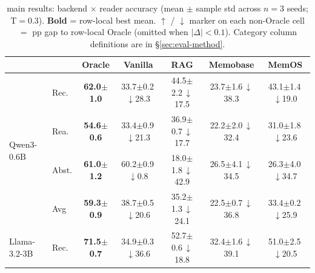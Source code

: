 \begin{table}[t]
\centering
\caption{\benchL{} main results: backend $\times$ reader accuracy (mean $\pm$ sample std across $n=3$ seeds; T$=$0.3). \textbf{Bold} = row-local best mean. {\tiny\textcolor{green!55!black}{$\uparrow$}} / {\tiny\textcolor{red!70!black}{$\downarrow$}} marker on each non-Oracle cell $=$ pp gap to row-local Oracle (omitted when $|\Delta| < 0.1$). Category column definitions are in \S\ref{sec:eval-method}.}
\label{tab:results-L}
\footnotesize
\setlength{\tabcolsep}{4pt}
\renewcommand{\arraystretch}{1.15}
\begin{tabular}{@{}ll c c c c c @{}}
\toprule
 & & \textbf{Oracle} & \textbf{Vanilla} & \textbf{RAG} & \textbf{Memobase} & \textbf{MemOS} \\
\midrule
\multirow{4}{*}{Qwen3-0.6B} & Rec. & \textbf{62.0{\scriptsize$\pm$1.0}} & 33.7{\scriptsize$\pm$0.2}\,{\tiny\textcolor{red!70!black}{$\downarrow$28.3}} & 44.5{\scriptsize$\pm$2.2}\,{\tiny\textcolor{red!70!black}{$\downarrow$17.5}} & 23.7{\scriptsize$\pm$1.6}\,{\tiny\textcolor{red!70!black}{$\downarrow$38.3}} & 43.1{\scriptsize$\pm$1.4}\,{\tiny\textcolor{red!70!black}{$\downarrow$19.0}} \\
 & Rea. & \textbf{54.6{\scriptsize$\pm$0.6}} & 33.4{\scriptsize$\pm$0.9}\,{\tiny\textcolor{red!70!black}{$\downarrow$21.3}} & 36.9{\scriptsize$\pm$0.7}\,{\tiny\textcolor{red!70!black}{$\downarrow$17.7}} & 22.2{\scriptsize$\pm$2.0}\,{\tiny\textcolor{red!70!black}{$\downarrow$32.4}} & 31.0{\scriptsize$\pm$1.8}\,{\tiny\textcolor{red!70!black}{$\downarrow$23.6}} \\
 & Abst. & \textbf{61.0{\scriptsize$\pm$1.2}} & 60.2{\scriptsize$\pm$0.9}\,{\tiny\textcolor{red!70!black}{$\downarrow$0.8}} & 18.0{\scriptsize$\pm$1.8}\,{\tiny\textcolor{red!70!black}{$\downarrow$42.9}} & 26.5{\scriptsize$\pm$4.1}\,{\tiny\textcolor{red!70!black}{$\downarrow$34.5}} & 26.3{\scriptsize$\pm$4.0}\,{\tiny\textcolor{red!70!black}{$\downarrow$34.7}} \\
 & Avg & \textbf{59.3{\scriptsize$\pm$0.9}} & 38.7{\scriptsize$\pm$0.5}\,{\tiny\textcolor{red!70!black}{$\downarrow$20.6}} & 35.2{\scriptsize$\pm$1.3}\,{\tiny\textcolor{red!70!black}{$\downarrow$24.1}} & 22.5{\scriptsize$\pm$0.7}\,{\tiny\textcolor{red!70!black}{$\downarrow$36.8}} & 33.4{\scriptsize$\pm$0.2}\,{\tiny\textcolor{red!70!black}{$\downarrow$25.9}} \\
\midrule
\multirow{4}{*}{Llama-3.2-3B} & Rec. & \textbf{71.5{\scriptsize$\pm$0.7}} & 34.9{\scriptsize$\pm$0.3}\,{\tiny\textcolor{red!70!black}{$\downarrow$36.6}} & 52.7{\scriptsize$\pm$0.6}\,{\tiny\textcolor{red!70!black}{$\downarrow$18.8}} & 32.4{\scriptsize$\pm$1.6}\,{\tiny\textcolor{red!70!black}{$\downarrow$39.1}} & 51.0{\scriptsize$\pm$2.5}\,{\tiny\textcolor{red!70!black}{$\downarrow$20.5}} \\

\end{tabular}
\end{table}
